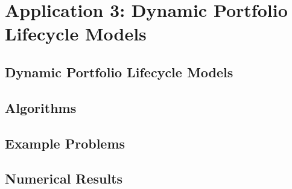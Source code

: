 
\chapter{Application 3: Dynamic Portfolio Lifecycle Models}


\section{Dynamic Portfolio Lifecycle Models}


\section{Algorithms}


\section{Example Problems}


\section{Numerical Results}

